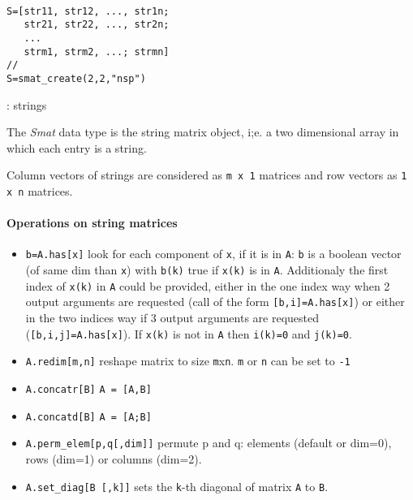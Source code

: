 
\begin{mandesc}
   \\
\end{mandesc}
\begin{calling_sequence}
\begin{verbatim}
S=[str11, str12, ..., str1n;
   str21, str22, ..., str2n;
   ...
   strm1, strm2, ...; strmn] 
// 
S=smat_create(2,2,"nsp")
\end{verbatim}
\end{calling_sequence}
\begin{parameters}
  \begin{varlist}
    : strings
  \end{varlist}
\end{parameters}

\begin{mandescription}
The \emph{Smat} data type is the string matrix  object, i;e. a
two dimensional array in which each entry is a string.

Column vectors of strings are considered as \verb!m x 1! matrices and row vectors
as \verb!1 x n! matrices.


\end{mandescription}

\paragraph{Operations on string matrices}
\begin{itemize}
\item \verb+b=A.has[x]+ look for each component of
  \verb+x+, if it is in \verb+A+: \verb+b+ is a boolean vector 
  (of same dim than \verb+x+) with \verb+b(k)+ true if
  \verb+x(k)+ is in \verb+A+. Additionaly the first index of
  \verb+x(k)+ in \verb+A+ could be provided, either in the one index way
  when 2 output arguments are requested (call of the form \verb+[b,i]=A.has[x]+) or
  either in the two indices way if 3 output arguments are requested
  (\verb+[b,i,j]=A.has[x]+). If \verb+x(k)+ is not in \verb+A+ then
  \verb+i(k)=0+ and \verb+j(k)=0+.
\end{itemize}
\begin{itemize}
\item \verb+A.redim[m,n]+ reshape matrix to size \verb+m+x\verb+n+. \verb+m+ or \verb+n+ can be set to \verb+-1+ 
\item \verb+A.concatr[B]+ \verb+A = [A,B]+
\item \verb+A.concatd[B]+ \verb+A = [A;B]+
\item \verb+A.perm_elem[p,q[,dim]]+ permute p and q: elements
  (default or dim=0), rows (dim=1) or columns (dim=2).
\item \verb+A.set_diag[B [,k]]+ sets the \verb+k+-th diagonal of matrix \verb+A+ to \verb+B+.
\end{itemize}

